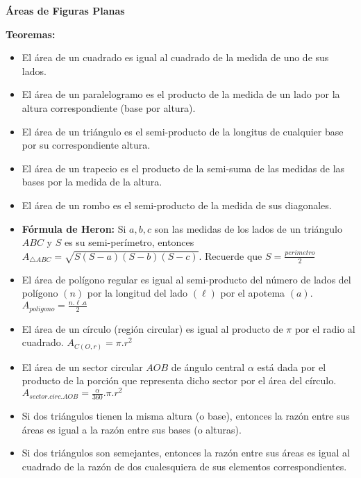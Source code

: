 \documentclass[•]{article}
\begin{document}
	\begin{center}
		\begin{huge}
			\textbf{\'Areas de Figuras Planas}
		\end{huge}
	\end{center}
	
	\begin{flushleft}
		\textbf{Teoremas:}
		\begin{itemize}
			\item El \'area de un cuadrado es igual al cuadrado de la medida de uno de sus lados. 
			\item El \'area de un paralelogramo es el producto de la medida de un lado por la altura correspondiente (base por altura).
			\item El \'area de un tri\'angulo es el semi-producto de la longitus de cualquier base por su correspondiente altura.
			\item El \'area de un trapecio es el producto de la semi-suma de las medidas de las bases por la medida de la altura.
			\item El \'area de un rombo es el semi-producto de la medida de sus diagonales.
			\item \textbf{F\'ormula de Heron: }Si $a, b, c$ son las medidas de los lados de un tri\'angulo $ABC$ y $S$ es su semi-per\'imetro, entonces $A_{\triangle ABC} = \sqrt{S(S - a)(S - b)(S - c)}$. Recuerde que $S = \frac{perimetro}{2}$
			
			\item El \'area de pol\'igono regular es igual al semi-producto del n\'umero de lados del pol\'igono $(n)$ por la longitud del lado $(\ell)$ por el apotema $(a)$. $A_{poligono} = \frac{n . \ell . a}{2} $
			
			\item El \'area de un c\'irculo (regi\'on circular) es igual al producto de $\pi$ por el radio al cuadrado. $A_{C(O, r)} = \pi . r^2$
			
			\item El \'area de un sector circular $AOB$ de \'angulo central $\alpha$ est\'a dada por el producto de la porci\'on que representa dicho sector por el \'area del c\'irculo. $A_{sector.circ.AOB} = \frac{\alpha}{360} . \pi . r^2$
			
			\item Si dos tri\'angulos tienen la misma altura (o base), entonces la raz\'on entre sus \'areas es igual a la raz\'on entre sus bases (o alturas).
			
			\item Si dos tri\'angulos son semejantes, entonces la raz\'on entre sus \'areas es igual al cuadrado de la raz\'on de dos cualesquiera de sus elementos correspondientes.
		\end{itemize}
		

\end{flushleft}
\end{document}
